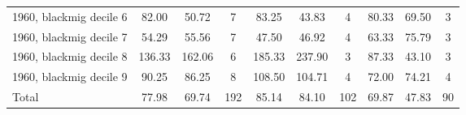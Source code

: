 \begin{table}[htbp]
\begin{tabular}{l*{3}{ccc}}
1960, blackmig decile 6&       82.00&       50.72&           7&       83.25&       43.83&           4&       80.33&       69.50&           3\\
1960, blackmig decile 7&       54.29&       55.56&           7&       47.50&       46.92&           4&       63.33&       75.79&           3\\
1960, blackmig decile 8&      136.33&      162.06&           6&      185.33&      237.90&           3&       87.33&       43.10&           3\\
1960, blackmig decile 9&       90.25&       86.25&           8&      108.50&      104.71&           4&       72.00&       74.21&           4\\
Total               &       77.98&       69.74&         192&       85.14&       84.10&         102&       69.87&       47.83&          90\\
\bottomrule
\end{tabular}
\end{table}
